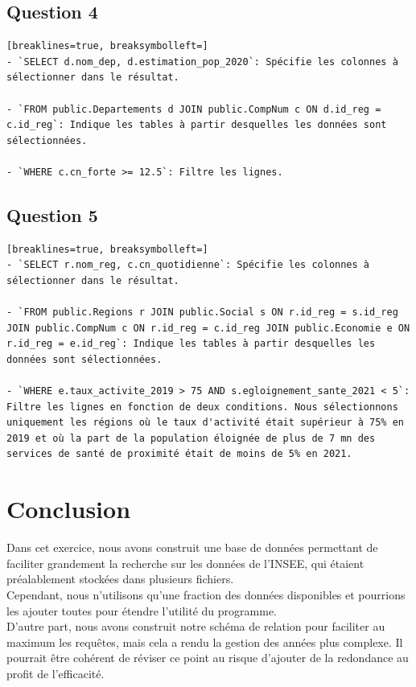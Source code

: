 \documentclass[a4paper, 11pt]{article}
\begin{document}
\subsection{Question 4}
\begin{Verbatim}[breaklines=true, breaksymbolleft=]
- `SELECT d.nom_dep, d.estimation_pop_2020`: Spécifie les colonnes à sélectionner dans le résultat.

- `FROM public.Departements d JOIN public.CompNum c ON d.id_reg = c.id_reg`: Indique les tables à partir desquelles les données sont sélectionnées.

- `WHERE c.cn_forte >= 12.5`: Filtre les lignes. 
\end{Verbatim}
\subsection{Question 5}
\begin{Verbatim}[breaklines=true, breaksymbolleft=]
- `SELECT r.nom_reg, c.cn_quotidienne`: Spécifie les colonnes à sélectionner dans le résultat. 

- `FROM public.Regions r JOIN public.Social s ON r.id_reg = s.id_reg JOIN public.CompNum c ON r.id_reg = c.id_reg JOIN public.Economie e ON r.id_reg = e.id_reg`: Indique les tables à partir desquelles les données sont sélectionnées.

- `WHERE e.taux_activite_2019 > 75 AND s.egloignement_sante_2021 < 5`: Filtre les lignes en fonction de deux conditions. Nous sélectionnons uniquement les régions où le taux d'activité était supérieur à 75% en 2019 et où la part de la population éloignée de plus de 7 mn des services de santé de proximité était de moins de 5% en 2021.
\end{Verbatim}

\section{Conclusion}
Dans cet exercice, nous avons construit une base de données permettant de faciliter grandement la recherche sur les données de l'INSEE, qui étaient préalablement stockées dans plusieurs fichiers.\\

Cependant, nous n'utilisons qu'une fraction des données disponibles et pourrions les ajouter toutes pour étendre l'utilité du programme.\\

D'autre part, nous avons construit notre schéma de relation pour faciliter au maximum les requêtes, mais cela a rendu la gestion des années plus complexe. Il pourrait être cohérent de réviser ce point au risque d'ajouter de la redondance au profit de l'efficacité.\\
\end{document}
